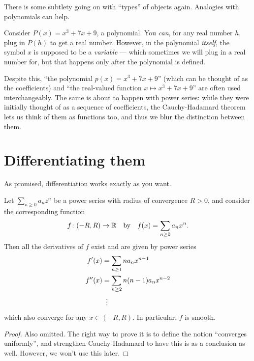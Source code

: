 \begin{abuse}
	There is some subtlety going on with ``types'' of objects again.
	Analogies with polynomials can help.

	Consider $P(x) = x^3 + 7x + 9$, a polynomial.
	You \emph{can}, for any real number $h$,
	plug in $P(h)$ to get a real number.
	However, in the polynomial \emph{itself},
	the symbol $x$ is supposed to be a \emph{variable} ---
	which sometimes we will plug in a real number for,
	but that happens only after the polynomial is defined.

	Despite this, ``the polynomial $p(x) = x^3+7x+9$''
	(which can be thought of as the coefficients)
	and ``the real-valued function $x \mapsto x^3+7x+9$''
	are often used interchangeably.
	The same is about to happen with power series:
	while they were initially thought of as a sequence of
	coefficients, the Cauchy-Hadamard theorem
	lets us think of them as functions too,
	and thus we blur the distinction between them.
%
\end{abuse}

\section{Differentiating them}
As promised, differentiation works exactly as you want.

\begin{theorem}
	Let $\sum_{n \ge 0} a_n z^n$ be a power series
	with radius of convergence $R > 0$,
	and consider the corresponding function
	\[ f \colon (-R,R) \to \mathbb R \quad\text{by}\quad
		f(x) = \sum_{n \ge 0} a_n x^n. \]
	Then all the derivatives of $f$ exist and
	are given by power series
	\begin{align*}
		f'(x) &= \sum_{n \ge 1} n a_n x^{n-1} \\
		f''(x) &= \sum_{n \ge 2} n(n-1) a_n x^{n-2} \\
		&\vdotswithin=
	\end{align*}
	which also converge for any $x \in (-R, R)$.
	In particular, $f$ is smooth.
\end{theorem}
\begin{proof}
	Also omitted.
	The right way to prove it is to define the notion
	``converges uniformly'',
	and strengthen Cauchy-Hadamard to have
	this is as a conclusion as well.
	However, we won't use this later.
\end{proof}

